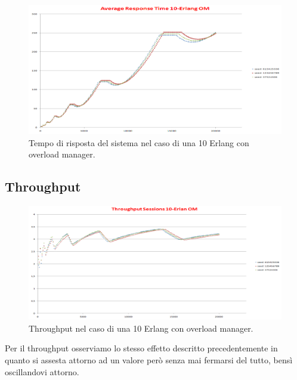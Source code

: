 \begin{figure}[H]
	\begin{center}
	\includegraphics[scale=0.4]{img/er_om_res_time.png}
	\caption[Tempo di risposta del sistema nel caso di una 10 Erlang con overload manager]{Tempo di risposta del sistema nel caso di una 10 Erlang con overload manager.}
	\label{fig:erl_om_res_time}
	\end{center}
\end{figure}

\subsection{Throughput}
\begin{figure}[H]
	\begin{center}
	\includegraphics[scale=0.4]{img/erl_om_t.png}
	\caption[Throughput nel caso di una 10 Erlang con overload manager]{Throughput nel caso di una 10 Erlang con overload manager.}
	\label{fig:erl_om_t}
	\end{center}
\end{figure}
Per il throughput osserviamo lo stesso effetto descritto precedentemente in quanto si assesta attorno ad un valore però senza mai fermarsi del tutto, bensì oscillandovi attorno.



